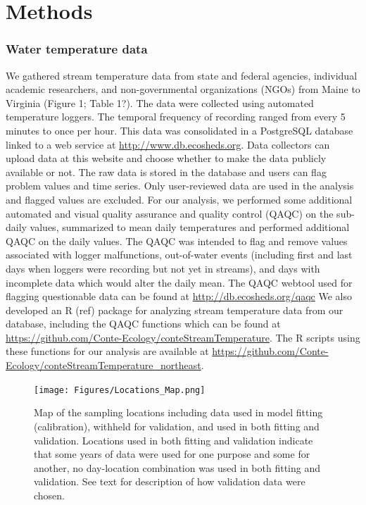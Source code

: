\documentclass[]{article}
\begin{document}
\section{Methods}\label{methods}

\subsubsection{Water temperature data}\label{water-temperature-data}

We gathered stream temperature data from state and federal agencies,
individual academic researchers, and non-governmental organizations
(NGOs) from Maine to Virginia (Figure 1; Table 1?). The data were
collected using automated temperature loggers. The temporal frequency of
recording ranged from every 5 minutes to once per hour. This data was
consolidated in a PostgreSQL database linked to a web service at
\url{http://www.db.ecosheds.org}. Data collectors can upload data at
this website and choose whether to make the data publicly available or
not. The raw data is stored in the database and users can flag problem
values and time series. Only user-reviewed data are used in the analysis
and flagged values are excluded. For our analysis, we performed some
additional automated and visual quality assurance and quality control
(QAQC) on the sub-daily values, summarized to mean daily temperatures
and performed additional QAQC on the daily values. The QAQC was intended
to flag and remove values associated with logger malfunctions,
out-of-water events (including first and last days when loggers were
recording but not yet in streams), and days with incomplete data which
would alter the daily mean. The QAQC webtool used for flagging
questionable data can be found at \url{http://db.ecosheds.org/qaqc} We
also developed an R (ref) package for analyzing stream temperature data
from our database, including the QAQC functions which can be found at
\url{https://github.com/Conte-Ecology/conteStreamTemperature}. The R
scripts using these functions for our analysis are available at
\url{https://github.com/Conte-Ecology/conteStreamTemperature_northeast}.

\begin{figure}[htbp]
\centering
\texttt{[image: Figures/Locations\_Map.png]}
\caption{Map of the sampling locations including data used in model
fitting (calibration), withheld for validation, and used in both fitting
and validation. Locations used in both fitting and validation indicate
that some years of data were used for one purpose and some for another,
no day-location combination was used in both fitting and validation. See
text for description of how validation data were chosen.}
\end{figure}
\end{document}

